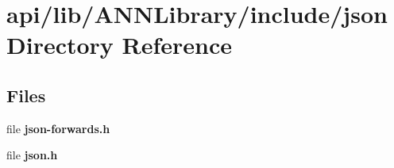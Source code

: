 \section{api/lib/\+A\+N\+N\+Library/include/json Directory Reference}
\label{dir_6b4a5323054eba024fde4872b97d3a33}
\subsection*{Files}
\begin{DoxyCompactItemize}
\item 
file {\bfseries json-\/forwards.\+h}
\item 
file {\bfseries json.\+h}
\end{DoxyCompactItemize}
